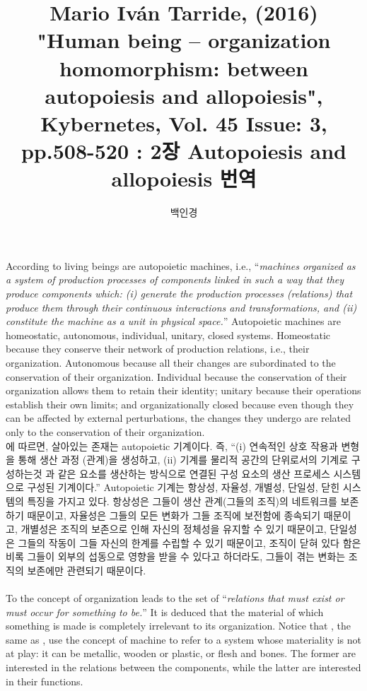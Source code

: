 \documentclass[11pt]{article} %
\title{Mario Iván Tarride, (2016) "Human being – organization homomorphism: between autopoiesis and
allopoiesis", Kybernetes, Vol. 45 Issue: 3, pp.508-520 : 2장 Autopoiesis and allopoiesis 번역}
\author{백인경}
\begin{document}
\maketitle

According to \citet[p.69]{maturana1994maquinas} living beings are autopoietic machines, i.e., ``\textit{machines organized as a system of production processes of components linked in such a way that they produce components which: (i) generate the production processes (relations) that produce them through their continuous interactions and transformations, and (ii) constitute the machine as a unit in physical space.}'' Autopoietic machines are homeostatic, autonomous, individual, unitary, closed systems. Homeostatic because they conserve their network of production relations, i.e., their organization. Autonomous because all their changes are subordinated to the conservation of their organization. Individual because the conservation of their organization allows them to retain their identity; unitary because their operations establish their own limits; and organizationally closed because even though they can be affected by external perturbations, the changes they undergo are related only to the conservation of their organization\citep{maturana1994maquinas}.
\\
\citet[p.69]{maturana1994maquinas}에 따르면, 살아있는 존재는 autopoietic 기계이다. 즉, ``(i) 연속적인 상호 작용과 변형을 통해 생산 과정 (관계)을 생성하고, (ii) 기계를 물리적 공간의 단위로서의 기계로 구성하는것 과 같은 요소를 생산하는 방식으로 연결된 구성 요소의 생산 프로세스 시스템으로 구성된 기계이다.'' Autopoietic 기계는 항상성, 자율성, 개별성, 단일성, 닫힌 시스템의 특징을 가지고 있다. 항상성은 그들이 생산 관계(그들의 조직)의 네트워크를 보존하기 때문이고, 자율성은 그들의 모든 변화가 그들 조직에 보전함에 종속되기 때문이고, 개별성은 조직의 보존으로 인해 자신의 정체성을 유지할 수 있기 때문이고, 단일성은 그들의 작동이 그들 자신의 한계를 수립할 수 있기 때문이고, 조직이 닫혀 있다 함은 비록 그들이 외부의 섭동으로 영향을 받을 수 있다고 하더라도, 그들이 겪는 변화는 조직의 보존에만 관련되기 때문이다\citep{maturana1994maquinas}.
\\
\\
To \citet{maturana1994maquinas} the concept of organization leads to the set of ``\textit{relations that must exist or must occur for something to be.}'' It is deduced that the material of which something is made is completely irrelevant to its organization. Notice that \citet{maturana1994maquinas}, the same as \citet{ashby1972introduccion}, use the concept of machine to refer to a system whose materiality is not at play: it can be metallic, wooden or plastic, or flesh and bones. The former are interested in the relations between the components, while the latter are interested in their functions.
\end{document}

